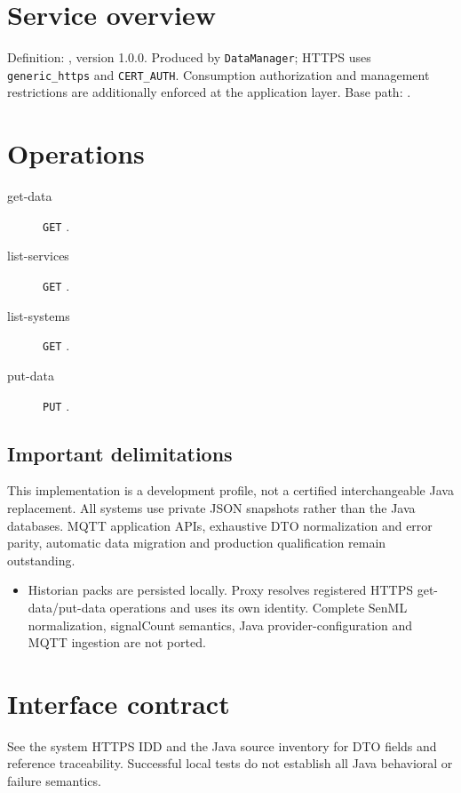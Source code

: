 \documentclass[a4paper]{arrowhead}
\begin{document}
\ArrowheadSetup
\section{Service overview}
Definition: , version 1.0.0. Produced by \texttt{DataManager}; HTTPS uses \texttt{generic\_https} and \texttt{CERT\_AUTH}. Consumption authorization and management restrictions are additionally enforced at the application layer. Base path: .
\section{Operations}
\begin{description}
\item[get-data] \texttt{GET} .
\item[list-services] \texttt{GET} .
\item[list-systems] \texttt{GET} .
\item[put-data] \texttt{PUT} .
\end{description}
\subsection{Important delimitations}
This implementation is a development profile, not a certified interchangeable Java replacement. All systems use private JSON snapshots rather than the Java databases. MQTT application APIs, exhaustive DTO normalization and error parity, automatic data migration and production qualification remain outstanding.
\begin{itemize}
\item Historian packs are persisted locally. Proxy resolves registered HTTPS get-data/put-data operations and uses its own identity. Complete SenML normalization, signalCount semantics, Java provider-configuration and MQTT ingestion are not ported.
\end{itemize}
\section{Interface contract}
See the system HTTPS IDD and the Java source inventory for DTO fields and reference traceability. Successful local tests do not establish all Java behavioral or failure semantics.
\end{document}
